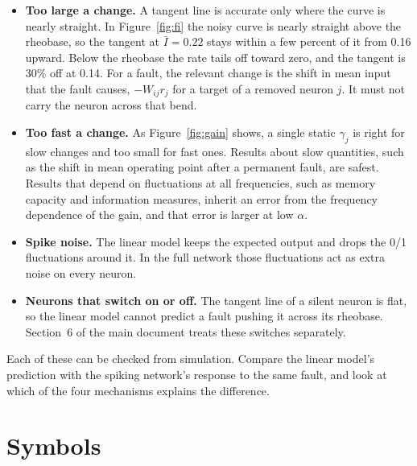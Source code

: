 \documentclass[11pt,a4paper]{article}
\begin{document}
\begin{itemize}
  \item \textbf{Too large a change.} A tangent line is accurate only where the curve is nearly straight. In Figure~\ref{fig:fi} the noisy curve is nearly straight above the rheobase, so the tangent at $\bar I = 0.22$ stays within a few percent of it from 0.16 upward. Below the rheobase the rate tails off toward zero, and the tangent is 30\% off at 0.14. For a fault, the relevant change is the shift in mean input that the fault causes, $-W_{ij} r_j$ for a target of a removed neuron $j$. It must not carry the neuron across that bend.
  \item \textbf{Too fast a change.} As Figure~\ref{fig:gain} shows, a single static $\gamma_j$ is right for slow changes and too small for fast ones. Results about slow quantities, such as the shift in mean operating point after a permanent fault, are safest. Results that depend on fluctuations at all frequencies, such as memory capacity and information measures, inherit an error from the frequency dependence of the gain, and that error is larger at low $\alpha$.
  \item \textbf{Spike noise.} The linear model keeps the expected output and drops the 0/1 fluctuations around it. In the full network those fluctuations act as extra noise on every neuron.
  \item \textbf{Neurons that switch on or off.} The tangent line of a silent neuron is flat, so the linear model cannot predict a fault pushing it across its rheobase. Section~6 of the main document treats these switches separately.
\end{itemize}
Each of these can be checked from simulation. Compare the linear model's prediction with the spiking network's response to the same fault, and look at which of the four mechanisms explains the difference.

\section*{Symbols}
\end{document}
